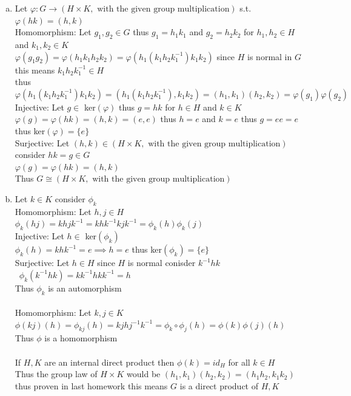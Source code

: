 \documentclass[12pt, letterpaper]{article}
\theoremstyle{definition}
\renewcommand{\t}[1]{\text{#1}}
\begin{document}
\begin{enumerate}[(a)]
\begin{itemize}
        thus $G=HK$
        \item (ii. $\implies$ i.) Assume ii.\\
        Let $g \in G$ s.t. $g=hk=ij$ for $h,i \in H$ and $kj \in K$\\
        thus $i^{-1}h=jk^{-1} \implies$ that is in $H \cap K$ thus $i^{-1}h=e \implies i=h$ and $jk^{-1}=e \implies j=k$ thus all $g\in G$ are a unique product of an $h \in H$ and $k \in K$ 
    \end{itemize}
    \item Let $\varphi : G \rightarrow (H \times K, \t{ with the given group multiplication})$ s.t. $\varphi(hk)=(h,k)$\\
    Homomorphism: Let $g_1,g_2 \in G$ thus $g_1=h_1k_1$ and $g_2=h_2k_2$ for $h_1,h_2 \in H$ and $k_1,k_2 \in K$\\
    $\varphi(g_1g_2)=\varphi(h_1k_1h_2k_2)=\varphi(h_1(k_1h_2k_1^{-1})k_1k_2)$ since $H$ is normal in $G$ this means $k_1h_2k_1^{-1} \in H$\\
    thus $\varphi(h_1(k_1h_2k_1^{-1})k_1k_2)=(h_1(k_1h_2k_1^{-1}), k_1k_2)=(h_1,k_1)(h_2,k_2)=\varphi(g_1)\varphi(g_2)$\\
    Injective: Let $g \in$ ker$(\varphi)$ thus $g=hk$ for $h \in H$ and $k \in K$\\
    $\varphi(g)=\varphi(hk)=(h,k)=(e,e)$ thus $h=e$ and $k=e$ thus $g=ee=e$ thus ker$(\varphi)=\{e\}$\\
    Surjective: Let $(h,k) \in (H \times K, \t{ with the given group multiplication})$ consider $hk=g \in G$\\
    $\varphi(g)=\varphi(hk)=(h,k)$\\
    Thus $G \cong (H \times K, \t{ with the given group multiplication})$
    \item Let $k \in K$ consider $\phi_k$\\
    Homomorphism: Let $h,j \in H$\\
    $\phi_k(hj)=khjk^{-1}=khk^{-1}kjk^{-1}=\phi_k(h)\phi_k(j)$\\
    Injective: Let $h \in$ ker$(\phi_k)$\\
    $\phi_k(h)=khk^{-1}=e \implies h=e$ thus ker$(\phi_k)=\{e\}$\\
    Surjective: Let $h \in H$ since $H$ is normal conisder $k^{-1}hk$\\\
    $\phi_k(k^{-1}hk)=kk^{-1}hkk^{-1}=h$\\
    Thus $\phi_k$ is an automorphism\\
    \phantom{text}\\
    Homomorphism: Let $k,j \in K$\\
    $\phi(kj)(h)=\phi_{kj}(h)=kjhj^{-1}k^{-1}=\phi_k\circ\phi_j(h)=\phi(k)\phi(j)(h)$\\
    Thus $\phi$ is a homomorphism\\
    \phantom{text}\\
    If $H,K$ are an internal direct product then $\phi(k)=id_H$ for all $k\in H$\\
    Thus the group law of $H \times K$ would be $(h_1,k_1)(h_2,k_2)=(h_1h_2,k_1k_2)$ thus proven in last homework this means $G$ is a direct product of $H,K$
\end{enumerate}
\end{document}
